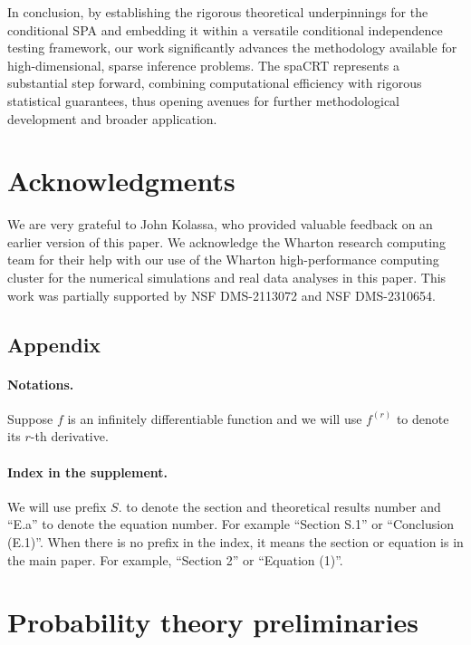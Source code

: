 \documentclass[12pt]{article}
\theoremstyle{definition}
\begin{document}
  In conclusion, by establishing the rigorous theoretical underpinnings for the conditional SPA and embedding it within a versatile conditional independence testing framework, our work significantly advances the methodology available for high-dimensional, sparse inference problems. The spaCRT represents a substantial step forward, combining computational efficiency with rigorous statistical guarantees, thus opening avenues for further methodological development and broader application.
  
  
  \section{Acknowledgments}
  
  We are very grateful to John Kolassa, who provided valuable feedback on an earlier version of this paper. We acknowledge the Wharton research computing team for their help with our use of the Wharton high-performance computing cluster for the numerical simulations and real data analyses in this paper. This work was partially supported by NSF DMS-2113072 and NSF DMS-2310654.
  


\printbibliography

\newpage

\appendix

\subsection*{Appendix}

\paragraph{Notations.}

Suppose $f$ is an infinitely differentiable function and we will use $f^{(r)}$ to denote its $r$-th derivative. 

\paragraph{Index in the supplement.}

We will use prefix $S.$ to denote the section and theoretical results number and ``E.a'' to denote the equation number. For example ``Section S.1'' or ``Conclusion (E.1)''. When there is no prefix in the index, it means the section or equation is in the main paper. For example, ``Section 2'' or ``Equation (1)''.


\section{Probability theory preliminaries}
\end{document}
